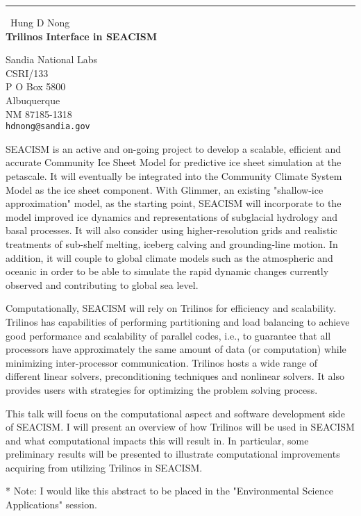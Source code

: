 \documentclass{report}
\begin{document}
\begin{center}
\rule{6in}{1pt} \
{\large Hung D Nong \\
{\bf Trilinos Interface in SEACISM}}

Sandia National Labs \\ CSRI/133 \\ P O Box 5800 \\ Albuquerque \\ NM 87185-1318
\\
{\tt hdnong@sandia.gov}\end{center}

SEACISM is an active and on-going project to develop a scalable,
efficient and accurate Community Ice Sheet Model for predictive ice sheet
simulation at the petascale. It will eventually be integrated into the
Community Climate System Model as the ice sheet component.
With Glimmer, an existing "shallow-ice approximation" model, as the
starting point, SEACISM will incorporate to the model improved ice
dynamics and representations of subglacial hydrology and basal processes.
It will also consider using higher-resolution grids and realistic
treatments of sub-shelf melting, iceberg calving and grounding-line
motion. In addition, it will couple to global climate models such as the
atmospheric and oceanic in order to be able to simulate the rapid dynamic
changes currently observed and contributing to global sea level.

Computationally, SEACISM will rely on Trilinos for efficiency and
scalability. Trilinos has capabilities of performing partitioning and
load balancing to achieve good performance and scalability of parallel
codes, i.e., to guarantee that all processors have approximately the same
amount of data (or computation) while minimizing inter-processor
communication. Trilinos hosts a wide range of different linear solvers,
preconditioning techniques and nonlinear solvers. It also provides users
with strategies for optimizing the problem solving process.

This talk will focus on the computational aspect and software development
side of SEACISM. I will present an overview of how Trilinos will be used
in SEACISM and what computational impacts this will result in. In
particular, some preliminary results will be presented to illustrate
computational improvements acquiring from utilizing Trilinos in SEACISM.





* Note: I would like this abstract to be placed in the "Environmental
Science Applications" session.
\end{document}
